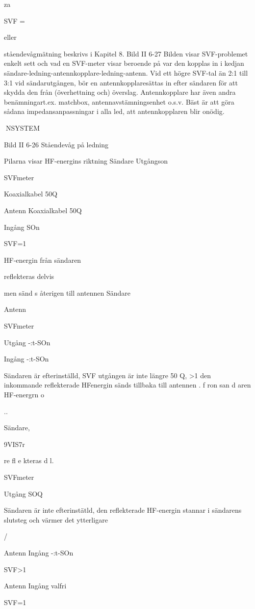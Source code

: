 {{{{za

SVF =

eller

ståendevågmätning beskrivs i Kapitel 8.
Bild II 6-27
Bilden visar SVF-problemet enkelt sett
och vad en SVF-meter visar beroende på
var den kopplas in i kedjan sändare-ledning-antennkopplare-ledning-antenn.
Vid ett högre SVF-tal än 2:1 till 3:1 vid
sändarutgången, bör en antennkopplaresättas in efter sändaren för att skydda den från
(överhettning och) överslag. Antennkopplare har även andra benämningart.ex. matchbox, antennavstämningsenhet o.s.v. Bäst
är att göra sådana impedansanpassningar i
alla led, att antennkopplaren blir onödig.

NSYSTEM

Bild II 6-26 Ståendevåg på ledning

Pilarna visar HF-energins riktning
Sändare
Utgångson

SVFmeter

Koaxialkabel 50Q

Antenn
Koaxialkabel 50Q

Ingång SOn

SVF=1

HF-energin från sändaren

reflekteras delvis

men sänd s återigen till antennen
Sändare

Antenn

SVFmeter

Utgång
-:t-SOn

Ingång
-:t-SOn

Sändaren är efterinställd,
SVF
utgången är inte längre 50 Q,
>1
den inkommande reflekterade HFenergin sänds tillbaka till antennen
. f ron san d aren
HF-energrn
o

..

Sändare,\

9VIS7r

re fl e kteras d l.

SVFmeter

Utgång SOQ

Sändaren är inte efterinstätld,
den reflekterade HF-energin
stannar i sändarens slutsteg
och värmer det ytterligare

/

Antenn
Ingång
-:t-SOn

SVF>1

Antenn
Ingång
valfri

SVF=1

~

}}}}
